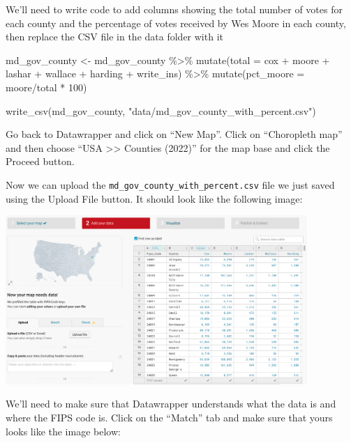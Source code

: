 \documentclass[
  letterpaper,
  DIV=11,
  numbers=noendperiod]{scrreprt}
\newenvironment{Shaded}{\begin{snugshade}}{\end{snugshade}}
\newcommand{\AttributeTok}[1]{\textcolor[rgb]{0.40,0.45,0.13}{#1}}
\newcommand{\DecValTok}[1]{\textcolor[rgb]{0.68,0.00,0.00}{#1}}
\newcommand{\FunctionTok}[1]{\textcolor[rgb]{0.28,0.35,0.67}{#1}}
\newcommand{\NormalTok}[1]{\textcolor[rgb]{0.00,0.23,0.31}{#1}}
\newcommand{\OtherTok}[1]{\textcolor[rgb]{0.00,0.23,0.31}{#1}}
\newcommand{\SpecialCharTok}[1]{\textcolor[rgb]{0.37,0.37,0.37}{#1}}
\newcommand{\StringTok}[1]{\textcolor[rgb]{0.13,0.47,0.30}{#1}}
\begin{document}
We'll need to write code to add columns showing the total number of
votes for each county and the percentage of votes received by Wes Moore
in each county, then replace the CSV file in the data folder with it

\begin{Shaded}
\begin{Highlighting}[]
\NormalTok{md\_gov\_county }\OtherTok{\textless{}{-}}\NormalTok{ md\_gov\_county }\SpecialCharTok{\%\textgreater{}\%} 
  \FunctionTok{mutate}\NormalTok{(}\AttributeTok{total =}\NormalTok{ cox }\SpecialCharTok{+}\NormalTok{ moore }\SpecialCharTok{+}\NormalTok{ lashar }\SpecialCharTok{+}\NormalTok{ wallace }\SpecialCharTok{+}\NormalTok{ harding }\SpecialCharTok{+}\NormalTok{ write\_ins) }\SpecialCharTok{\%\textgreater{}\%} 
  \FunctionTok{mutate}\NormalTok{(}\AttributeTok{pct\_moore =}\NormalTok{ moore}\SpecialCharTok{/}\NormalTok{total }\SpecialCharTok{*} \DecValTok{100}\NormalTok{)}

\FunctionTok{write\_csv}\NormalTok{(md\_gov\_county, }\StringTok{"data/md\_gov\_county\_with\_percent.csv"}\NormalTok{)}
\end{Highlighting}
\end{Shaded}

Go back to Datawrapper and click on ``New Map''. Click on ``Choropleth
map'' and then choose ``USA \textgreater\textgreater{} Counties (2022)''
for the map base and click the Proceed button.

Now we can upload the \texttt{md\_gov\_county\_with\_percent.csv} file
we just saved using the Upload File button. It should look like the
following image:

\includegraphics[width=4.5in,height=\textheight]{./images/datawrapper7.png}

We'll need to make sure that Datawrapper understands what the data is
and where the FIPS code is. Click on the ``Match'' tab and make sure
that yours looks like the image below:
\end{document}
